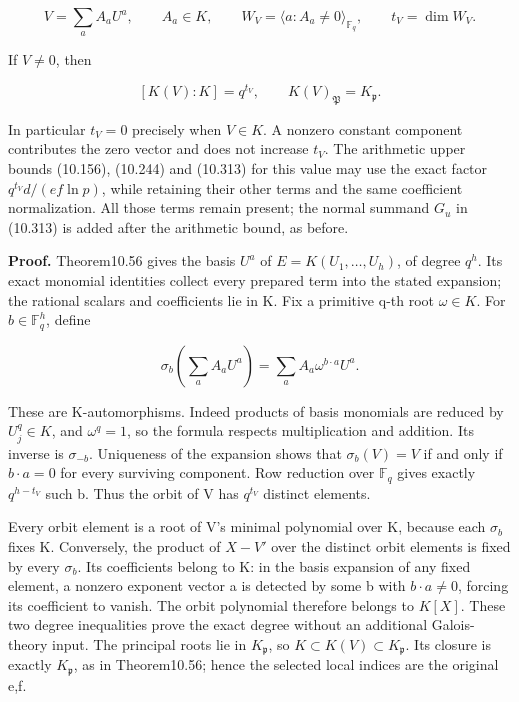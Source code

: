 \documentclass[
  11pt,
  a4paper,
]{article}
\begin{document}
\[
V=\sum_a A_aU^a,\qquad A_a\in K,\qquad
W_V=\langle a:A_a\ne0\rangle_{\mathbb F_q},\qquad t_V=\dim W_V.
\tag{10.429}
\]

If \(V\ne0\), then

\[
[K(V):K]=q^{t_V},\qquad K(V)_{\mathfrak P}=K_{\mathfrak p}.
\tag{10.430}
\]

In particular \(t_V=0\) precisely when \(V\in K\). A nonzero constant
component contributes the zero vector and does not increase \(t_V\). The
arithmetic upper bounds (10.156), (10.244) and (10.313) for this value
may use the exact factor \(q^{t_V}d/(ef\ln p)\), while retaining their
other terms and the same coefficient normalization. All those terms
remain present; the normal summand \(G_u\) in (10.313) is added after
the arithmetic bound, as before.

\textbf{Proof.} Theorem10.56 gives the basis \(U^a\) of
\(E=K(U_1,\ldots,U_h)\), of degree \(q^h\). Its exact monomial
identities collect every prepared term into the stated expansion; the
rational scalars and coefficients lie in K. Fix a primitive q-th root
\(\omega\in K\). For \(b\in\mathbb F_q^h\), define

\[
\sigma_b\!\left(\sum_a A_aU^a\right)
=\sum_a A_a\omega^{b\cdot a}U^a.
\tag{10.431}
\]

These are K-automorphisms. Indeed products of basis monomials are
reduced by \(U_j^q\in K\), and \(\omega^q=1\), so the formula respects
multiplication and addition. Its inverse is \(\sigma_{-b}\). Uniqueness
of the expansion shows that \(\sigma_b(V)=V\) if and only if
\(b\cdot a=0\) for every surviving component. Row reduction over
\(\mathbb F_q\) gives exactly \(q^{h-t_V}\) such b. Thus the orbit of V
has \(q^{t_V}\) distinct elements.

Every orbit element is a root of V's minimal polynomial over K, because
each \(\sigma_b\) fixes K. Conversely, the product of \(X-V'\) over the
distinct orbit elements is fixed by every \(\sigma_b\). Its coefficients
belong to K: in the basis expansion of any fixed element, a nonzero
exponent vector a is detected by some b with \(b\cdot a\ne0\), forcing
its coefficient to vanish. The orbit polynomial therefore belongs to
\(K[X]\). These two degree inequalities prove the exact degree without
an additional Galois-theory input. The principal roots lie in
\(K_{\mathfrak p}\), so \(K\subset K(V)\subset K_{\mathfrak p}\). Its
closure is exactly \(K_{\mathfrak p}\), as in Theorem10.56; hence the
selected local indices are the original e,f.
\end{document}
